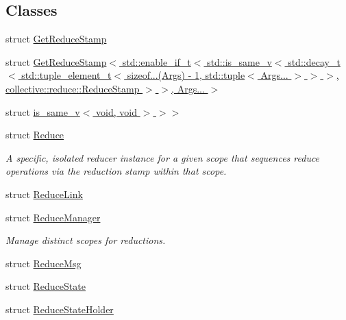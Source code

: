 \subsection*{Classes}
\begin{DoxyCompactItemize}
\item 
struct \hyperlink{structvt_1_1collective_1_1reduce_1_1_get_reduce_stamp}{Get\+Reduce\+Stamp}
\item 
struct \hyperlink{structvt_1_1collective_1_1reduce_1_1_get_reduce_stamp_3_01std_1_1enable__if__t_3_01std_1_1is__sa2cf8316b2e34c0a2685c4cd088c88737}{Get\+Reduce\+Stamp$<$ std\+::enable\+\_\+if\+\_\+t$<$ std\+::is\+\_\+same\+\_\+v$<$ std\+::decay\+\_\+t$<$ std\+::tuple\+\_\+element\+\_\+t$<$ sizeof...(\+Args) -\/ 1, std\+::tuple$<$ Args... $>$ $>$ $>$, collective\+::reduce\+::\+Reduce\+Stamp $>$ $>$, Args... $>$}
\item 
struct \hyperlink{structvt_1_1collective_1_1reduce_1_1_get_reduce_stamp_3_01std_1_1enable__if__t_3_01std_1_1is__saac3f8a4cbf86762dde62215be4a56bf0}{is\+\_\+same\+\_\+v$<$ void, void $>$ $>$$>$}
\item 
struct \hyperlink{structvt_1_1collective_1_1reduce_1_1_reduce}{Reduce}
\begin{DoxyCompactList}\small\item\em A specific, isolated reducer instance for a given scope that sequences reduce operations via the reduction stamp within that scope. \end{DoxyCompactList}\item 
struct \hyperlink{structvt_1_1collective_1_1reduce_1_1_reduce_link}{Reduce\+Link}
\item 
struct \hyperlink{structvt_1_1collective_1_1reduce_1_1_reduce_manager}{Reduce\+Manager}
\begin{DoxyCompactList}\small\item\em Manage distinct scopes for reductions. \end{DoxyCompactList}\item 
struct \hyperlink{structvt_1_1collective_1_1reduce_1_1_reduce_msg}{Reduce\+Msg}
\item 
struct \hyperlink{structvt_1_1collective_1_1reduce_1_1_reduce_state}{Reduce\+State}
\item 
struct \hyperlink{structvt_1_1collective_1_1reduce_1_1_reduce_state_holder}{Reduce\+State\+Holder}
\end{DoxyCompactItemize}

